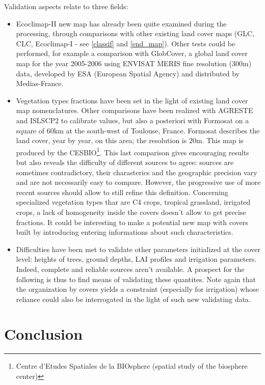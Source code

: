 Validation aspects relate to three fields: 
\begin{itemize}
\item{Ecoclimap-II new map has already been quite examined during the processing, through comparisons with 
other existing land cover maps (GLC, CLC, Ecoclimap-I - see \ref{classif} and \ref{end_map}). Other tests could be performed, for 
example a comparison with GlobCover, a global land cover map for the year 2005-2006 using ENVISAT MERIS 
fine resolution (300m) data, developed by ESA (European Spatial Agency) and distributed by Medias-France.}
\item{Vegetation types fractions have been set in the light of existing land cover map nomenclatures. Other comparisons 
have been realized with AGRESTE and ISLSCP2 to calibrate values, but also a posteriori with Formosat on a square 
of 60km at the south-west of Toulouse, France. Formosat describes the land cover, year by year, on this area; 
the resolution is 20m. This map is produced by the CESBIO\footnote{Centre d'Etudes Spatiales de la 
BIOsphere (spatial study of the biosphere center)}. This last comparison gives encouraging results but also 
reveals the difficulty of different sources to agree: sources are sometimes contradictory, 
their charasterics and the geographic precision vary and are not necessarily easy to compare. However, 
the progressive use of more recent sources should allow to still refine this definition. Concerning 
specialized vegetation types thar are C4 crops, tropical grassland, irrigated crops, a lack of 
homogeneity inside the covers doesn't allow to get precise fractions. It could be interesting to 
make a potential new map with covers built by introducing entering informations about such characteristics. }
\item{Difficulties have been met to validate other parameters initialized at the cover level: heights of 
trees, ground depths, LAI profiles and irrigation parameters. Indeed, complete and reliable sources 
aren't available. A prospect for the following is thus to find means of validating these quantites. Note again that 
the organization by covers yields a constraint (especially for irrigation) whose reliance could also be interrogated in the light 
of such new validating data. }
\end{itemize}


\chapter{Conclusion}

